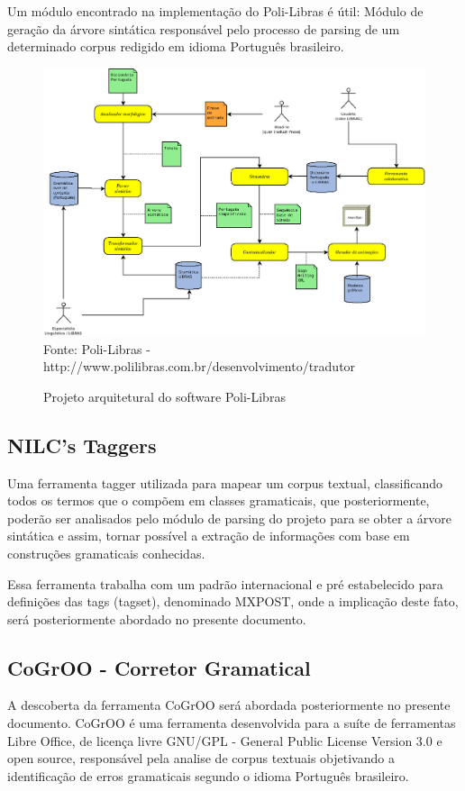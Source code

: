 Um módulo encontrado na implementação do Poli-Libras é útil: Módulo de geração da árvore sintática responsável pelo processo de parsing de um determinado corpus redigido em idioma Português brasileiro.

\begin{figure}[H]
\centering
\caption{Projeto arquitetural do software Poli-Libras} %
\includegraphics[scale=0.325]{arquitetura}\\  %
{\small Fonte: Poli-Libras - http://www.polilibras.com.br/desenvolvimento/tradutor} %
\label{fig:exemplo} %
\end{figure}

\subsection{NILC's Taggers}
Uma ferramenta tagger utilizada para mapear um corpus textual, classificando todos os termos que o compõem em classes gramaticais, que posteriormente, poderão ser analisados pelo módulo de parsing do projeto para se obter a árvore sintática e assim, tornar possível a extração de informações com base em construções gramaticais conhecidas.

Essa ferramenta trabalha com um padrão internacional e pré estabelecido para definições das tags (tagset), denominado MXPOST, onde a implicação deste fato, será posteriormente abordado no presente documento.


\subsection{CoGrOO - Corretor Gramatical}
A descoberta da ferramenta CoGrOO será abordada posteriormente no presente documento. CoGrOO é uma ferramenta desenvolvida para a suíte de ferramentas Libre Office, de licença livre GNU/GPL - General Public License Version 3.0 e open source, responsável pela analise de corpus textuais objetivando a identificação de erros gramaticais segundo o idioma Português brasileiro.


